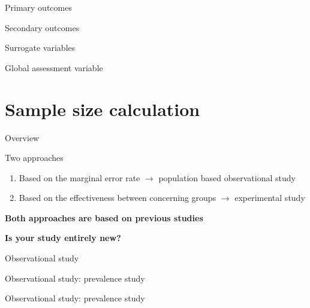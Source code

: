 \documentclass[9pt,ignorenonframetext,xcolor=dvipsnames]{beamer}
\providecommand{\tightlist}{%
  \setlength{\itemsep}{0pt}\setlength{\parskip}{0pt}}
\newlength{\wideitemsep}
\let\olditem\item
\renewcommand{\item}{\setlength{\itemsep}{\wideitemsep}\olditem}
\begin{document}
\begin{frame}{Primary outcomes}

\end{frame}

\begin{frame}{Secondary outcomes}

\end{frame}

\begin{frame}{Surrogate variables}

\end{frame}

\begin{frame}{Global assessment variable}

\end{frame}

\section{Sample size calculation}\label{sample-size-calculation}

\begin{frame}{Overview}

\begin{block}{Two approaches}

\begin{enumerate}
\def\labelenumi{\arabic{enumi}.}
\tightlist
\item
  Based on the marginal error rate \(\rightarrow\) population based
  observational study
\item
  Based on the effectiveness between concerning groups \(\rightarrow\)
  experimental study
\end{enumerate}

\textbf{Both approaches are based on previous studies}

\textbf{Is your study entirely new?}

\end{block}

\end{frame}

\begin{frame}{Observational study}

\end{frame}

\begin{frame}{Observational study: prevalence study}

\end{frame}

\begin{frame}{Observational study: prevalence study}

\end{frame}
\end{document}
